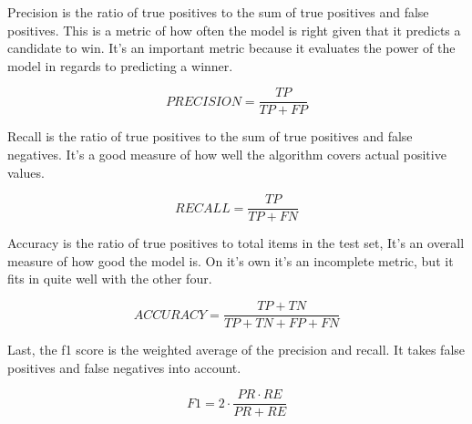 \documentclass[11pt, twoside, reqno]{book}
\begin{document}
Precision is the ratio of true positives to the sum of true positives and false positives. This is a metric of how often the model is right given that it predicts a candidate to win. It's an important metric because it evaluates the power of the model in regards to predicting a winner. 

\begin{equation}
\label{eq:precision}
PRECISION = \dfrac{TP}{TP+FP}
\end{equation}

Recall is the ratio of true positives to the sum of true positives and false negatives. It's a good measure of how well the algorithm covers actual positive values. 

\begin{equation}
\label{eq:recall}
RECALL = \dfrac{TP}{TP+FN}
\end{equation}

Accuracy is the ratio of true positives to total items in the test set, It's an overall measure of how good the model is. On it's own it's an incomplete metric, but it fits in quite well with the other four. 

\begin{equation}
\label{eq:accuracy}
ACCURACY = \dfrac{TP+TN}{TP+TN+FP+FN}
\end{equation}

Last, the f1 score is the weighted average of the precision and recall. It takes false positives and false negatives into account. 

\begin{equation}
\label{eq:f1}
F1 = 2 \cdot \dfrac{PR \cdot RE}{PR + RE}
\end{equation}
\end{document}
